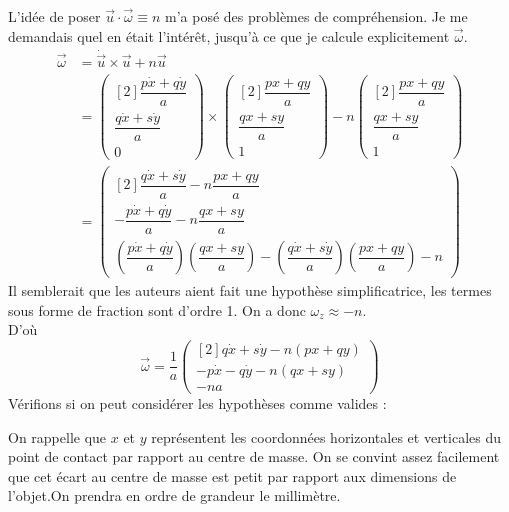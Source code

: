 \documentclass[12pt,a4paper]{article}
\begin{document}
	L'idée de poser $\vec{u}\cdot\vec{\omega}\equiv n$ m'a posé des problèmes de compréhension. Je me demandais quel en était l'intérêt, jusqu'à ce que je calcule explicitement $\vec{\omega}$.\\
	\bgroup
	\addtolength{\jot}{5pt}
	\begin{align*}
	\vec{\omega} &= \dot{\vec{u}}\times\vec{u}+n\vec{u}\\
	&=\begin{pmatrix}[2]\dfrac{p\dot{x}+q\dot{y}}{a}\\\dfrac{q\dot{x}+s\dot{y}}{a}\\0\end{pmatrix} \times \begin{pmatrix}[2]\dfrac{px+qy}{a}\\\dfrac{qx+sy}{a}\\1\end{pmatrix} -n\begin{pmatrix}[2]\dfrac{px+qy}{a}\\\dfrac{qx+sy}{a}\\1\end{pmatrix}\\
	&=\begin{pmatrix}[2]
	\dfrac{q\dot{x}+s\dot{y}}{a}-n\dfrac{px+qy}{a}\\
	-\dfrac{p\dot{x}+q\dot{y}}{a}-n\dfrac{qx+sy}{a}\\
	\left(\dfrac{p\dot{x}+q\dot{y}}{a}\right)  \left(\dfrac{qx+sy}{a}\right)  - \left(\dfrac{q\dot{x}+s\dot{y}}{a}\right)  \left( \dfrac{px+qy}{a}\right)  - n
	\end{pmatrix}
	\end{align*}
	Il semblerait que les auteurs aient fait une hypothèse simplificatrice, les termes sous forme de fraction sont d'ordre 1. On a donc $\omega_z\approx-n$.\\
	D'où
	\begin{equation}
	\vec{\omega}=\dfrac{1}{a}\begin{pmatrix}[2]
	q\dot{x}+s\dot{y}-n(px+qy)\\
	-p\dot{x}-q\dot{y}-n(qx+sy)\\
	- na
	\end{pmatrix}
	\end{equation}
	\egroup
	Vérifions si on peut considérer les hypothèses comme valides :
	
	
	On rappelle que $x$ et $y$ représentent les coordonnées horizontales et verticales du point de contact par rapport au centre de masse. On se convint assez facilement que cet écart au centre de masse est petit par rapport aux dimensions de l'objet.On prendra en ordre de grandeur le millimètre.
	
\end{document}
